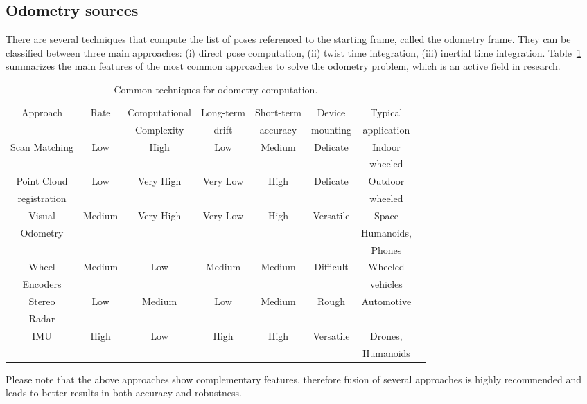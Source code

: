\subsection{Odometry sources}
There are several techniques that compute the list of poses referenced to the starting frame, called the odometry frame. They can be classified between three main approaches: (i) direct pose computation, (ii) twist time integration, (iii) inertial time integration. Table~\ref{tab:odom_sources} summarizes the main features of the most common approaches to solve the odometry problem, which is an active field in research. 
\begin{table}[hbt] \centering
\caption{Common techniques for odometry computation.}
\begin{tabular}
[c]{|c|c|c|c|c|c|c|c|}
\hline
\rowcolor{gray}    
Approach & Rate & Computational & Long-term & Short-term & Device & Typical \\
\rowcolor{gray}    
& & Complexity& drift & accuracy & mounting & application \\
\hline
Scan Matching & Low & High & Low & Medium & Delicate & Indoor \\
& & & & & & wheeled\\
\hline
Point Cloud & Low & Very High & Very Low & High & Delicate & Outdoor\\
registration & & & & & & wheeled\\
\hline
Visual & Medium & Very High & Very Low & High & Versatile & Space\\
Odometry & & & & & & Humanoids,\\
 & & & & & & Phones\\
\hline
Wheel & Medium & Low & Medium & Medium & Difficult & Wheeled\\
Encoders & & & & & & vehicles\\
\hline
Stereo & Low & Medium & Low & Medium & Rough & Automotive\\
Radar & & & & & & \\
\hline
IMU & High & Low & High & High & Versatile & Drones, \\
 & & & & & & Humanoids\\
\hline
\end{tabular}
\label{tab:odom_sources}
\end{table}

Please note that the above approaches show complementary features, therefore fusion of several approaches is highly recommended and leads to better results in both accuracy and robustness. 


